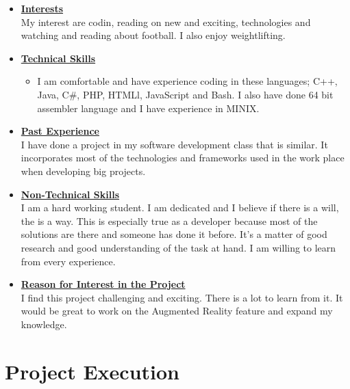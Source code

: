 \documentclass[a4paper,12pt]{article}
\begin{document}
\begin{itemize}
\item {\large \underline{\textbf{Interests}}}\\[0.2cm]
My interest are codin, reading on new and exciting, technologies and watching and reading about football. I also enjoy weightlifting.


\item {\large \underline{\textbf{Technical Skills}}}

	\begin{itemize}
		\item I am comfortable and have experience coding in these languages; C++, Java, C\#, PHP, HTMLl, JavaScript and Bash. I also have done 64 bit assembler language and I have experience in MINIX.
	\end{itemize}
\bigskip
\item {\large \underline{\textbf{Past Experience}}}\\[0.2cm]
I have done a project in my software development class that is similar. It incorporates  most of the technologies and frameworks used in the work place when developing big projects.
\\
\item {\large \underline{\textbf{Non-Technical Skills}}}\\[0.2cm]
 I am a hard working student. I am dedicated and I believe if there is a will, the is a way. This is especially true as a developer because most of the solutions are there and someone has done it before. It's a matter of good research and good understanding of the task at hand. I am willing to learn from every experience. 
\\
\item {\large \underline{\textbf{Reason for Interest in the Project}}}\\[0.2cm]
I find this project challenging and exciting. There is a lot to learn from it. It would be great to work on the Augmented Reality feature and expand my knowledge.

\end{itemize}

\newpage
\section{Project Execution}
\end{document}

